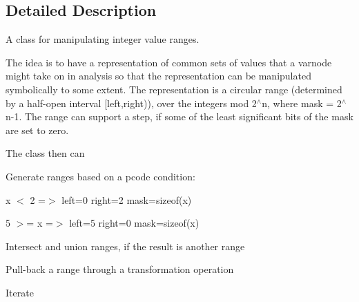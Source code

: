 

\subsection{Detailed Description}
A class for manipulating integer value ranges. 

The idea is to have a representation of common sets of values that a varnode might take on in analysis so that the representation can be manipulated symbolically to some extent. The representation is a circular range (determined by a half-\/open interval \mbox{[}left,right)), over the integers mod 2$^\wedge$n, where mask = 2$^\wedge$n-\/1. The range can support a step, if some of the least significant bits of the mask are set to zero.

The class then can
\begin{DoxyItemize}
\item Generate ranges based on a pcode condition\+:
\begin{DoxyItemize}
\item x $<$ 2 =$>$ left=0 right=2 mask=sizeof(x)
\item 5 $>$= x =$>$ left=5 right=0 mask=sizeof(x)
\end{DoxyItemize}
\item Intersect and union ranges, if the result is another range
\item Pull-\/back a range through a transformation operation
\item Iterate
\end{DoxyItemize}


\begin{DoxyCode}{0}
\DoxyCodeLine{\textcolor{keywordflow}{do} \{}
\end{DoxyCode}
 


